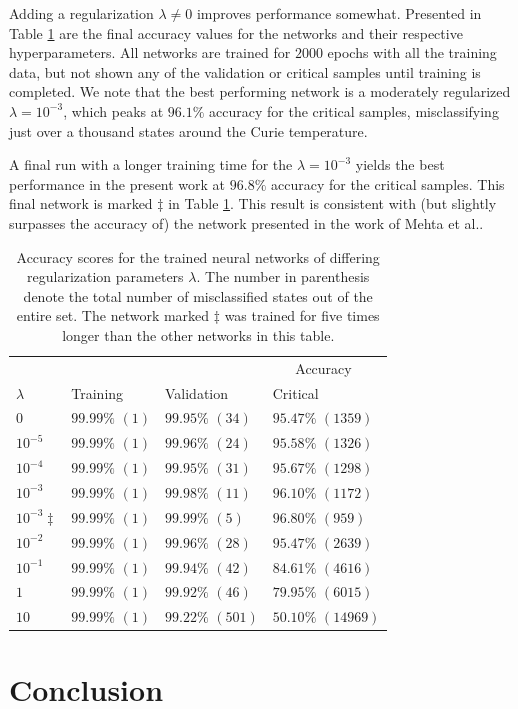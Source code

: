 \documentclass[a4paper, twocolumn]{article}
\newcommand{\tab}[1]{Table \ref{tab:#1}}
\begin{document}
Adding a regularization $\lambda\not=0$ improves performance somewhat. Presented in \tab{nn_2d} are the final accuracy values for the networks and their respective hyperparameters. All networks are trained for $2000$ epochs with all the training data, but not shown any of the validation or critical samples until training is completed. We note that the best performing network is a moderately regularized $\lambda=10^{-3}$, which peaks at $96.1\%$ accuracy for the critical samples, misclassifying just over a thousand states around the Curie temperature. 

A final run with a longer training time for the $\lambda=10^{-3}$ yields the best performance in the present work at $96.8\%$ accuracy for the critical samples. This final network is marked $\ddag$ in \tab{nn_2d}. This result is consistent with (but slightly surpasses the accuracy of) the network presented in the work of Mehta et al.\autocite{mehta2018highbias}.

\newlength{\myrowskip}
\setlength{\myrowskip}{10pt}
\begin{table}
\centering{}
\setlength\extrarowheight{2pt}
\begin{tabularx}{\textwidth}{XXXX}
\toprule
& \multicolumn{3}{l}{ \ \ \ \ \ \  \ \ \ \ \ \  \ \ \ \ \ \  \ \ \ \ \ \  \ \ \ \ \ \  \ \ Accuracy} \\
\cline{2-4}
$\lambda$ & Training & Validation & Critical \\
\midrule
$0$         &   $99.99\%$ $(1)$     & $99.95\%$ $(34)$    & $95.47\%$ $(1359)$ \\ 
$10^{-5}$   &   $99.99\%$ $(1)$     & $99.96\%$ $(24)$    & $95.58\%$ $(1326)$ \\ 
$10^{-4}$   &   $99.99\%$ $(1)$     & $99.95\%$ $(31)$    & $95.67\%$ $(1298)$ \\ 
$10^{-3}$   &   $99.99\%$ $(1)$     & $99.98\%$ $(11)$    & $96.10\%$ $(1172)$ \\ 
$10^{-3}\ddag$   &   $99.99\%$ $(1)$     & $99.99\%$ $(5)$    & $96.80\%$ $(959)$ \\ 
$10^{-2}$   &   $99.99\%$ $(1)$     & $99.96\%$ $(28)$    & $95.47\%$ $(2639)$ \\ 
$10^{-1}$   &   $99.99\%$ $(1)$     & $99.94\%$ $(42)$    & $84.61\%$ $(4616)$ \\ 
$1$         &   $99.99\%$ $(1)$     & $99.92\%$ $(46)$    & $79.95\%$ $(6015)$ \\ 
$10$        &   $99.99\%$ $(1)$     & $99.22\%$ $(501)$   & $50.10\%$ $(14969)$ \\
\bottomrule 
\end{tabularx}
\caption{Accuracy scores for the trained neural networks of differing regularization parameters $\lambda$. The number in parenthesis denote the total number of misclassified states out of the entire set. The network marked $\ddag$ was trained for five times longer than the other networks in this table. \label{tab:nn_2d}}
\end{table}


\section{Conclusion}
\lipsum[11]

\onecolumn{
\printbibliography
}
\end{document}
